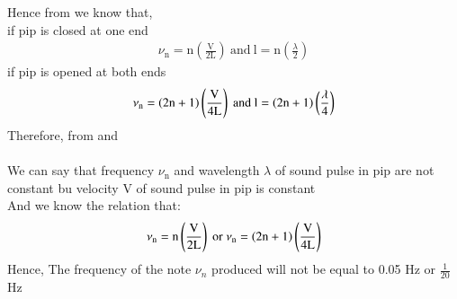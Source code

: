 \documentclass[beamer]{IEEEtran}
\theoremstyle{remark}
\begin{document}
Hence from \brak{\ref{a1}} we know that,\\
if pip is closed at one end\\
\begin{align}
\label{a2}
\nu_\text{n}=\text{n}\left(\frac{\text{V}}{\text{2L}}\right)\ \text{and}\ \text{l}=\text{n}\left(\frac{\lambda}{2}\right)
\end{align}
if pip is opened at both ends\\
\begin{align}
\label{a3}
\nu_\text{n}=\brak{2\text{n}+1}\left(\frac{\text{V}}{4\text{L}}\right)\ \text{and}\ \text{l}=\brak{2\text{n}+1}\left(\frac{\lambda}{4}\right)
\end{align}
Therefore, from \brak{\ref{a2}} and \brak{\ref{a3}}\\\\
We can say that frequency $\nu_\text{n}$ and wavelength $\lambda$ of sound pulse in pip are not constant bu velocity V of sound pulse in pip is constant\\

 And we know the relation that:
\begin{align}
    \label{a4}
    \nu_\text{n}=\text{n}\left(\frac{\text{V}}{2\text{L}}\right)\ \text{or}\ \nu_\text{n}=\brak{2\text{n}+1}\left(\frac{\text{V}}{4\text{L}}\right)
\end{align}
Hence, The frequency of the note $\nu_n$ produced will not be equal to 0.05 Hz or $\frac{1}{20}$ Hz 
\end{document}
